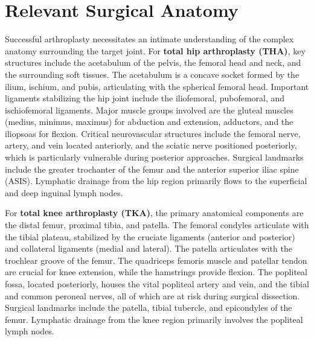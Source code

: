 \section*{Relevant Surgical Anatomy}
Successful arthroplasty necessitates an intimate understanding of the complex anatomy surrounding the target joint. For \textbf{total hip arthroplasty (THA)}, key structures include the acetabulum of the pelvis, the femoral head and neck, and the surrounding soft tissues. The acetabulum is a concave socket formed by the ilium, ischium, and pubis, articulating with the spherical femoral head. Important ligaments stabilizing the hip joint include the iliofemoral, pubofemoral, and ischiofemoral ligaments. Major muscle groups involved are the gluteal muscles (medius, minimus, maximus) for abduction and extension, adductors, and the iliopsoas for flexion. Critical neurovascular structures include the femoral nerve, artery, and vein located anteriorly, and the sciatic nerve positioned posteriorly, which is particularly vulnerable during posterior approaches. Surgical landmarks include the greater trochanter of the femur and the anterior superior iliac spine (ASIS). Lymphatic drainage from the hip region primarily flows to the superficial and deep inguinal lymph nodes.

For \textbf{total knee arthroplasty (TKA)}, the primary anatomical components are the distal femur, proximal tibia, and patella. The femoral condyles articulate with the tibial plateau, stabilized by the cruciate ligaments (anterior and posterior) and collateral ligaments (medial and lateral). The patella articulates with the trochlear groove of the femur. The quadriceps femoris muscle and patellar tendon are crucial for knee extension, while the hamstrings provide flexion. The popliteal fossa, located posteriorly, houses the vital popliteal artery and vein, and the tibial and common peroneal nerves, all of which are at risk during surgical dissection. Surgical landmarks include the patella, tibial tubercle, and epicondyles of the femur. Lymphatic drainage from the knee region primarily involves the popliteal lymph nodes.

